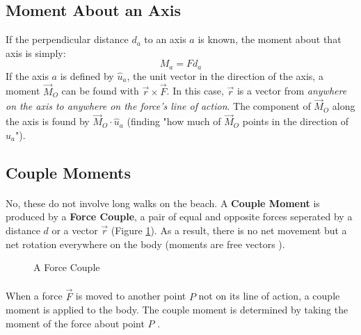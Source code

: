 \documentclass[12pt]{article}
\begin{document}
\subsection{Moment About an Axis}
If the perpendicular distance $d_a$ to an axis $a$ is known, the moment about that axis is simply:
\begin{equation*}
    M_a = Fd_a
\end{equation*}
If the axis $a$ is defined by $\hat{u}_a$, the unit vector in the direction of the axis, a moment $\vec{M}_O$ can be found with $\vec{r} \times \vec{F}$.
In this case, $\vec{r}$ is a vector from \textit{anywhere on the axis to anywhere on the force's line of action}.
The component of $\vec{M}_O$ along the axis is found by $\vec{M}_O \cdot \hat{u}_a$ (finding "how much of $\vec{M}_O$ points in the direction of $\hat{u}_a$").

\subsection{Couple Moments}
\paragraph{}
No, these do not involve long walks on the beach. 
A \textbf{Couple Moment} is produced by a \textbf{Force Couple}, a pair of equal and opposite forces seperated by a distance $d$ or a vector $\vec{r}$ (Figure \ref{coupleMoment}).
As a result, there is no net movement but a net rotation everywhere on the body (moments are free vectors \cite{buckham}).

\begin{figure}[h]
    \centering
    \caption{A Force Couple}
    \label{coupleMoment}
\end{figure}

\paragraph{}
When a force $\vec{F}$ is moved to another point $P$ not on its line of action, a couple moment is applied to the body.
The couple moment is determined by taking the moment of the force about point $P$ \cite{hibbeler}.
\end{document}

